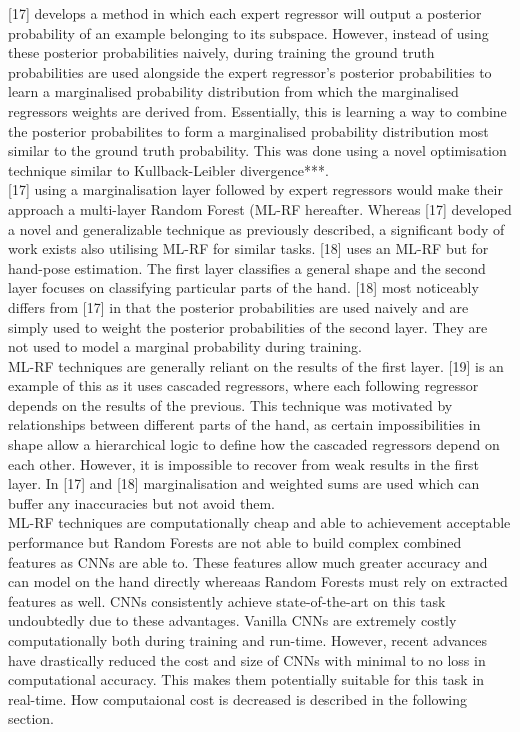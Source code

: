 \documentclass{article}
\begin{document}
[17] develops a method in which each expert regressor will output a posterior probability of an example belonging to its subspace. However, instead of using these posterior probabilities naively, during training the ground truth probabilities are used alongside the expert regressor's posterior probabilities to learn a marginalised probability distribution from which the marginalised regressors weights are derived from. Essentially, this is learning a way to combine the  posterior probabilites to form a marginalised probability distribution most similar to the ground truth probability. This was done using a novel optimisation technique similar to  Kullback-Leibler divergence***.\\

[17] using a marginalisation layer followed by expert regressors would make their approach a multi-layer Random Forest (ML-RF hereafter. Whereas [17] developed a novel and generalizable technique as previously described, a significant body of work exists also utilising ML-RF for similar tasks. [18] uses an ML-RF but for hand-pose estimation. The first layer classifies a general shape and the second layer focuses on classifying particular parts of the hand. [18] most noticeably differs from [17] in that the posterior probabilities are used naively and are simply used to weight the posterior probabilities of the second layer. They are not used to model a marginal probability during training. \\

ML-RF techniques are generally reliant on the results of the first layer. [19] is an example of this as it uses cascaded regressors, where each following regressor depends on the results of the previous. This technique was motivated by relationships between different parts of the hand, as certain impossibilities in shape allow a hierarchical logic to define how the cascaded regressors depend on each other. However, it is impossible to recover from weak results in the first layer. In [17] and [18] marginalisation and weighted sums are used which can buffer any inaccuracies but not avoid them. \\

ML-RF techniques are computationally cheap and able to achievement acceptable performance but Random Forests are not able to build complex combined features as CNNs are able to. These features allow much greater accuracy and can model on the hand directly whereaas Random Forests must rely on extracted features as well. CNNs consistently achieve state-of-the-art on this task undoubtedly due to these advantages. Vanilla CNNs are extremely costly computationally both during training and run-time. However, recent advances have drastically reduced the cost and size of CNNs with minimal to no loss in computational accuracy. This makes them potentially suitable for this task in real-time. How computaional cost is decreased is described in the following section. \\
\end{document}
